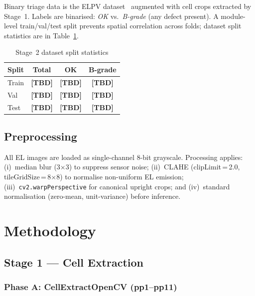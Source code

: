 \documentclass[conference]{IEEEtran}
\begin{document}
Binary triage data is the ELPV dataset~\cite{deitsch2019}
augmented with cell crops extracted by Stage~1.
Labels are binarised: \textit{OK} vs.\ \textit{B-grade}
(any defect present).
A module-level train/val/test split prevents spatial
correlation across folds; dataset split statistics are
in Table~\ref{tab:datasplit}.

\begin{table}[t]
  \caption{Stage~2 dataset split statistics}
  \label{tab:datasplit}
  \begin{center}
  \renewcommand{\arraystretch}{1.05}
  \small
  \begin{tabular}{lccc}
    \toprule
    \textbf{Split} & \textbf{Total} & \textbf{OK} & \textbf{B-grade} \\
    \midrule
    Train & \textbf{[TBD]} & \textbf{[TBD]} & \textbf{[TBD]} \\
    Val   & \textbf{[TBD]} & \textbf{[TBD]} & \textbf{[TBD]} \\
    Test  & \textbf{[TBD]} & \textbf{[TBD]} & \textbf{[TBD]} \\
    \bottomrule
  \end{tabular}
  \end{center}
\end{table}

\subsection{Preprocessing}
All EL images are loaded as single-channel 8-bit grayscale.
Processing applies: (i)~median blur (3$\times$3) to suppress
sensor noise; (ii)~CLAHE (clipLimit\,=\,2.0,
tileGridSize\,=\,8$\times$8) to normalise non-uniform EL
emission; (iii)~\texttt{cv2.warpPerspective} for canonical
upright crops; and (iv)~standard normalisation
(zero-mean, unit-variance) before inference.

\section{Methodology}
\label{sec:method}

\subsection{Stage 1 --- Cell Extraction}
\label{sec:stage1}

\subsubsection{Phase A: CellExtractOpenCV (pp1--pp11)}
\end{document}
